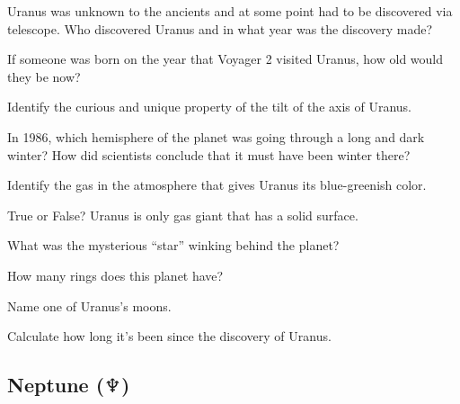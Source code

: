 \documentclass{article}
\numberwithin{equation}{section}
\numberwithin{figure}{section}
\begin{document}
\begin{exercise}
    Uranus was unknown to the ancients and at some point had to be discovered via telescope. Who discovered Uranus and in what year was the discovery made?
\end{exercise}

\begin{exercise}
    If someone was born on the year that Voyager 2 visited Uranus, how old would they be now?
\end{exercise}

\begin{exercise}
    Identify the curious and unique property of the tilt of the axis of Uranus.
\end{exercise}

\begin{exercise}
    In 1986, which hemisphere of the planet was going through a long and dark winter? How did scientists conclude that it must have been winter there?
\end{exercise}

\begin{exercise}
    Identify the gas in the atmosphere that gives Uranus its blue-greenish color.
\end{exercise}

\begin{exercise}
    True or False? Uranus is only gas giant that has a solid surface.
\end{exercise}

\begin{exercise}
    What was the mysterious ``star'' winking behind the planet?
\end{exercise}

\begin{exercise}
    How many rings does this planet have?
\end{exercise}

\begin{exercise}
    Name one of Uranus's moons.
\end{exercise}

\begin{exercise}
    Calculate how long it's been since the discovery of Uranus.
\end{exercise}

\clearpage

\subsection{Neptune ($\Neptune$)} \label{yka1VU}
\end{document}
